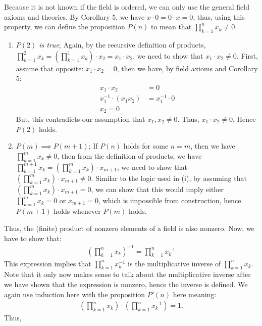 \documentclass[12pt]{book}
\theoremstyle{definition}
\begin{document}
\begin{sol}
Because it is not known if the field is ordered, we can only use the general field axioms and theories. By Corollary 5, we have $x\cdot 0 =0\cdot x=0$, thus, using this property, we can define the proposition $P(n)$ to mean that $\prod_{k=1}^n x_k \neq 0$. 
\begin{enumerate}[label = (\roman*)]
 \item \textit{$P(2)$ is true}; Again, by the recursive definition of products, $\prod_{k=1}^2x_k = (\prod_{k=1}^1x_k)\cdot x_2=x_1\cdot x_2$, we need to show that $x_1 \cdot x_2 \neq 0$. First, assume that opposite: $x_1\cdot x_2 =0$, then we have, by field axioms and Corollary 5:
 	\begin{align*}
 		x_1\cdot x_2 &=0\\
 		x_1^{-1} \cdot (x_1x_2) &= x_1^{-1} \cdot 0\\
 		x_2=0 		 
 	\end{align*}
But, this contradicts our assumption that $x_1, x_2 \neq 0$. Thus, $x_1\cdot x_2 \neq 0$. Hence $P(2)$ holds.
\item $P(m) \implies P(m+1)$; If $P(n)$ holds for some $n=m$, then we have $\prod_{k=1}^m x_k \neq 0$, then from the definition of products, we have $\prod_{k=1}^{m+1} x_k = (\prod_{k=1}^m x_k)\cdot x_{m+1}$, we need to show that $(\prod_{k=1}^m x_k)\cdot x_{m+1} \neq 0$. Similar to the logic used in (i), by assuming that  $(\prod_{k=1}^m x_k)\cdot x_{m+1} = 0$, we can show that this would imply either $\prod_{k=1}^m x_k =0$ or $x_{m+1} = 0$, which is impossible from construction, hence $P(m+1)$ holds whenever $P(m)$ holds. 
\end{enumerate}
\indent Thus, the (finite) product of nonzero elements of a field is also nonzero. Now, we have to show that:
\begin{align*}
	\left(\prod_{k=1}^n x_k \right)^{-1} = \prod_{k=1}^n x_k^{-1}	
\end{align*}
This expression implies that $\prod_{k=1}^n x_k^{-1}$ is the multiplicative inverse of $\prod_{k=1}^n x_k $. Note that it only now makes sense to talk about the multiplicative inverse after we have shown that the expression is nonzero, hence the inverse is defined. We again use induction here with the proposition $P'(n)$ here meaning:
\begin{align*}
	 \left(\prod_{k=1}^n x_k\right) \cdot \left(\prod_{k=1}^n x_k^{-1}\right) = 1.
\end{align*}
Thus, 
\begin{enumerate}[label=(\roman*)$'$]

\end{enumerate}
\end{sol}
\end{document}
